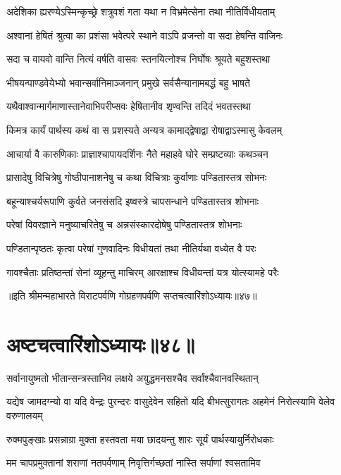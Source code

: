 \twolineshloka
{अदेशिका ह्यरण्येऽस्मिन्कृच्छ्रे शत्रुवशं गता}
{यथा न विभ्रमेत्सेना तथा नीतिर्विधीयताम्}


\twolineshloka
{अश्वानां हेषितं श्रुत्वा का प्रशंसा भवेत्परे}
{स्थाने वाऽपि व्रजन्तो वा सदा हेषन्ति वाजिनः}


\twolineshloka
{सदा च वायवो वान्ति नित्यं वर्षति वासवः}
{स्तनयित्नोश्च निर्घोषः श्रूयते बहुशस्तथा}


\twolineshloka
{भीषयन्पाण्डवेयेभ्यो भवान्सर्वानिमाञ्जनान्}
{प्रमुखे सर्वसैन्यानामबद्धं बहु भाषते}


\twolineshloka
{यथैवाश्वान्मार्गमाणास्तानेवाभिपरीप्सवः}
{हेषितानीव शृण्वन्ति तदिदं भवतस्तथा}


\twolineshloka
{किमत्र कार्यं पार्थस्य कथं वा स प्रशस्यते}
{अन्यत्र कामाद्द्वेषाद्वा रोषाद्वाऽस्मासु केवलम्}


\twolineshloka
{आचार्या वै कारुणिकाः प्राज्ञाश्चापायदर्शिनः}
{नैते महाहवे घोरे सम्प्रष्टव्याः कथञ्चन}


\twolineshloka
{प्रासादेषु विचित्रेषु गोष्ठीपानाशनेषु च}
{कथा विचित्राः कुर्वाणाः पण्डितास्तत्र सोभनः}


\twolineshloka
{बहून्याश्चर्यरूपाणि कुर्वते जनसंसदि}
{इष्वस्त्रे चापसन्धाने पण्डितास्तत्र शोभनाः}


\twolineshloka
{परेषां विवरज्ञाने मनुष्याचरितेषु च}
{अन्नसंस्कारदोषेषु पण्डितास्तत्र शोभनाः}


\twolineshloka
{पण्डितान्पृष्ठतः कृत्वा परेषां गुणवादिनः}
{विधीयतां तथा नीतिर्यथा वध्येत वै परः}


\twolineshloka
{गावश्चैताः प्रतिष्ठन्तां सेनां व्यूहन्तु माचिरम्}
{आरक्षाश्च विधीयन्तां यत्र योत्स्यामहे परैः}

॥इति श्रीमन्महाभारते विराटपर्वणि गोग्रहणपर्वणि सप्तचत्वारिंशोऽध्यायः॥४७॥

\chapter{अष्टचत्वारिंशोऽध्यायः॥४८॥}

\twolineshloka
{सर्वानायुष्मतो भीतान्सन्त्रस्तानिव लक्षये}
{अयुद्धमनसश्चैव सर्वांश्चैवानवस्थितान्}


\threelineshloka
{यद्येष जामदग्न्यो वा यदि वेन्द्रः पुरन्दरः}
{वासुदेवेन सहितो यदि बीभत्सुरागतः}
{अहमेनं निरोत्स्यामि वेलेव वरुणालयम्}


\twolineshloka
{रुक्मपुङ्खाः प्रसन्नाग्रा मुक्ता हस्तवता मया}
{छादयन्तु शारः सूर्यं पार्थस्यायुर्निरोधकाः}


\twolineshloka
{मम चापप्रमुक्तानां शराणां नतपर्वणाम्}
{निवृत्तिर्गच्छतां नास्ति सर्पाणां श्वसतामिव}


